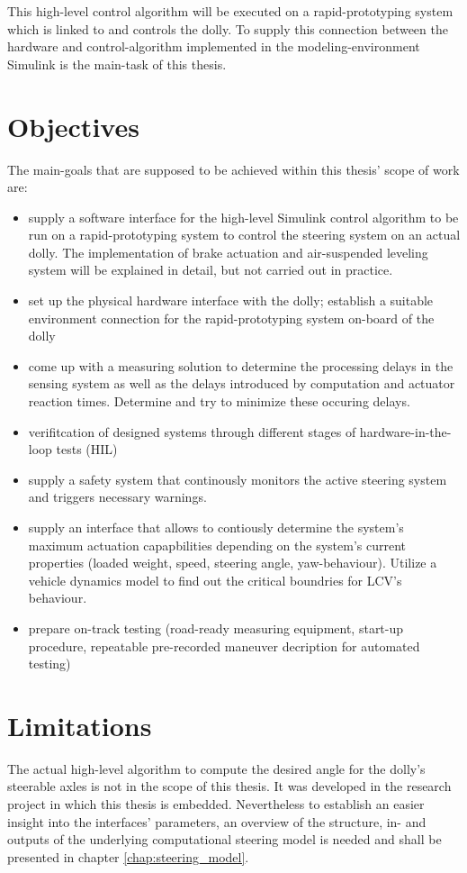 \documentclass[ExampleMasters.tex]{subfiles}
\begin{document}
This high-level control algorithm will be executed on a rapid-prototyping system which is linked to and controls the dolly. To supply this connection between the hardware and control-algorithm implemented in the modeling-environment Simulink is the main-task of this thesis.    

\section{Objectives}
\label{sec:objectives}
The main-goals that are supposed to be achieved within this thesis' scope of work are: 

\begin{itemize}
	\item{supply a software interface for the high-level Simulink control algorithm to be run on a rapid-prototyping system to control the steering system on an actual dolly. The implementation of brake actuation and air-suspended leveling system will be explained in detail, but not carried out in practice.}
	\item{set up the physical hardware interface with the dolly; establish a suitable environment connection for the rapid-prototyping system on-board of the dolly} 
	\item{come up with a measuring solution to determine the processing delays in the sensing system as well as the delays introduced by computation and actuator reaction times. Determine and try to minimize these occuring delays.}  
	\item{verifitcation of designed systems through different stages of hardware-in-the-loop tests (HIL)}
	\item{supply a safety system that continously monitors the active steering system and triggers necessary warnings.}
	\item{supply an interface that allows to contiously determine the system's maximum actuation capapbilities depending on the system's current properties (loaded weight, speed, steering angle, yaw-behaviour). Utilize a vehicle dynamics model to find out the critical boundries for LCV's behaviour.}	
	\item{prepare on-track testing (road-ready measuring equipment, start-up procedure, repeatable pre-recorded maneuver decription for automated testing)}
	
\end{itemize}



\section{Limitations}
\label{sec:limitations}
The actual high-level algorithm to compute the desired angle for the dolly's steerable axles is not in the scope of this thesis. It was developed in the research project in which this thesis is embedded. Nevertheless to establish an easier insight into the interfaces' parameters, an overview of the structure, in- and outputs of the underlying computational steering model is needed and shall be presented in chapter \ref{chap:steering_model}. 
\end{document}
